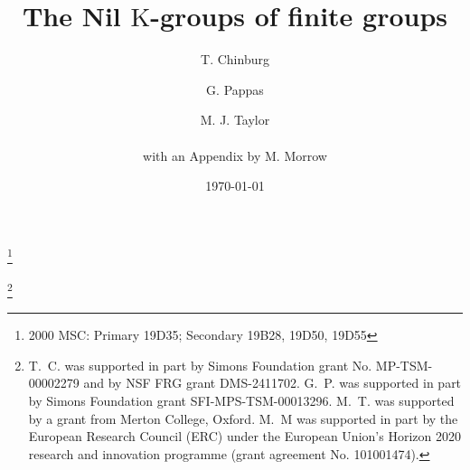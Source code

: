\documentclass[reqno,11pt,letterpaper]{amsart}
\theoremstyle{plain}
\numberwithin{equation}{subsection}
\theoremstyle{remark}
\theoremstyle{plain}
\theoremstyle{definition}\newtheorem*{notation}{Notation}
\newcommand{\mar}[1]{\marginpar{\small #1}}
\newcommand{\RK}{\mathrm{K}}
\begin{document}
\title{The  Nil $\RK$-groups of finite groups}

 

 
 \author[T. Chinburg]{T. Chinburg}

\author[G. Pappas]{G. Pappas}

\author[M. Taylor]{M. J. Taylor  \\ \\ { {\scriptsize with  an Appendix by}} M. Morrow}
 \thanks{2000  MSC: Primary 19D35; Secondary  19B28, 19D50, 19D55}

 \thanks{T.~C. was supported in part by Simons Foundation grant No. MP-TSM-00002279 and by NSF FRG grant DMS-2411702. G.~P. was supported in part by Simons Foundation grant SFI-MPS-TSM-00013296. M.~T. was supported by a grant from Merton College, Oxford.
M.~M was supported in part by the European Research Council (ERC) under the European Union’s Horizon 2020 research and innovation programme (grant agreement No. 101001474).}
 


\address{  Dept. of
Mathematics\\
Univ. of Pennsylvania\\
Philadelphia\\
PA 19104\\
USA} 

\address{ 
Dept. of
Mathematics\\
Michigan State
Univ.\\
E. Lansing\\
MI 48824\\
USA}

\address{ Merton College\\ University of Oxford\\ OX1 4JD\\ U.K. }
 
\address{ CNRS \& Laboratoire de Mathématiques d’Orsay\\
Faculté des Sciences d’Orsay, Université Paris-Saclay\\
F-91405 Orsay Cedex\\
France}
 

\date{\today}
\end{document}
